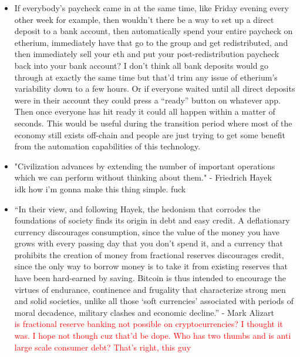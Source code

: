 \documentclass{article}[10pt]
\begin{document}
\begin{itemize}
    \item If everybody’s paycheck came in at the same time, like Friday evening every other week for example, then wouldn’t there be a way to set up a direct deposit to a bank account, then automatically spend your entire paycheck on etherium, immediately have that go to the group and get redistributed, and then immediately sell your eth and put your post-redistribution paycheck back into your bank account? 
    I don’t think all bank deposits would go through at exactly the same time but that’d trim any issue of etherium’s variability down to a few hours. 
    Or if everyone waited until all direct deposits were in their account they could press a “ready” button on whatever app. 
    Then once everyone has hit ready it could all happen within a matter of seconds.
    This would be useful during the transition period where most of the economy still exists off-chain and people are just trying to get some benefit from the automation capabilities of this technology.
    
    \item "Civilization advances by extending the number of important operations which we can perform without thinking about them."
    - Friedrich Hayek \autocite{hayek1945use}\\
    idk how i'm gonna make this thing simple.
    fuck
    
    \item “In their view, and following Hayek, the hedonism that corrodes the foundations of society finds its origin in debt and easy credit. 
    A deflationary currency discourages consumption, since the value of the money you have grows with every passing day that you don’t spend it, and a currency that prohibits the creation of money from fractional reserves discourages credit, since the only way to borrow money is to take it from existing reserves that have been hard-earned by saving. 
    Bitcoin is thus intended to encourage the virtues of endurance, continence and frugality that characterize strong men and solid societies, unlike all those ‘soft currencies’ associated with periods of moral decadence, military clashes and economic decline.”
    - Mark Alizart\autocite{alizart}\\
    \textcolor{red}{is fractional reserve banking not possible on cryptocurrencies?
    I thought it was.
    I hope not though cuz that'd be dope.
    Who has two thumbs and is anti large scale consumer debt?
    That's right, this guy}
    

\end{itemize}
\end{document}
